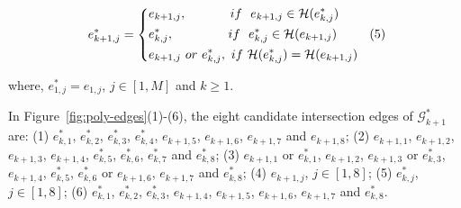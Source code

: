 \vspace{-2ex}
\begin{equation*}
\label{equ-inter-edge-it}
    \begin{aligned}
        \hspace{1ex}  e^*_{k+1, j} = \left\{
            \begin{aligned}
                & e_{k+1, j},   \hspace{8ex}if~~ e_{k+1,j} \in \mathcal{H}(e^*_{k,j}) \\
                & e^*_{k, j},   \hspace{10ex}if~~ e^*_{k,j} \in \mathcal{H}(e_{k+1,j})      \hspace{6ex} (5)  \\
                & e_{k+1, j} ~or~ e^*_{k, j}, ~if~ \mathcal{H}(e^*_{k,j}) = \mathcal{H}(e_{k+1,j}) \\
            \end{aligned}
        \right.
    \end{aligned}
\end{equation*}
\vspace{-1ex}

where,  $e^*_{1, j} = e_{1, j}$, $j \in [1, M]$ and $k\ge 1$.



\begin{example}
In Figure~\ref{fig:poly-edges}(1)-(6), the eight candidate intersection edges of $\mathcal{G}^*_{k+1}$ are:
(1) $e^*_{k,1}$, $e^*_{k,2}$, $e^*_{k,3}$, $e^*_{k,4}$, $e_{k+1,5}$, $e_{k+1,6}$, $e_{k+1,7}$ and $e_{k+1,8}$;
%
(2) $e_{k+1,1}$, $e_{k+1,2}$, $e_{k+1,3}$, $e_{k+1,4}$, $e^*_{k,5}$, $e^*_{k,6}$, $e^*_{k,7}$ and $e^*_{k,8}$;
%
(3) $e_{k+1,1}$ or $e^*_{k,1}$, $e_{k+1,2}$, $e_{k+1,3}$ or $e^*_{k,3}$, $e_{k+1,4}$, $e^*_{k,5}$, $e^*_{k,6}$ or $e_{k+1,6}$, $e_{k+1,7}$ and $e^*_{k,8}$;
%
(4) $e_{k+1,j}$, $j \in [1, 8]$;
%
(5) $e^*_{k,j}$, $j \in [1, 8]$;
%
(6) $e^*_{k,1}$, $e^*_{k,2}$, $e^*_{k,3}$, $e_{k+1,4}$, $e_{k+1,5}$, $e_{k+1,6}$, $e_{k+1,7}$ and $e^*_{k,8}$.
\end{example}





